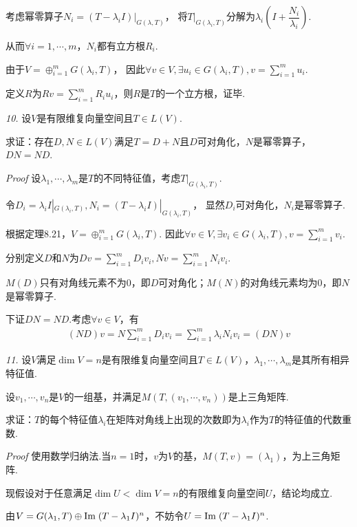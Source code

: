 考虑幂零算子\(N_i=(T-\lambda_i I)|_{G(\lambda,T)}\)，
将\(T|_{G(\lambda_i,T)}\)分解为\(\lambda_i(I+\dfrac{N_i}{\lambda_i})\).

从而\(\forall i=1,\cdots,m\)，\(N_i\)都有立方根\(R_i\).

由于\(V=\oplus_{i=1}^m G(\lambda_i,T)\)，
因此\(\forall v \in V,\exists u_i \in G(\lambda_i,T),v=\sum_{i=1}^m u_i\).

定义\(R\)为\(Rv=\sum_{i=1}^m R_iu_i\)，则\(R\)是\(T\)的一个立方根，证毕.

\newpage

\textit{10.}
设\(V\)是有限维复向量空间且\(T \in L(V)\).

求证：存在\(D,N \in L(V)\)满足\(T=D+N\)且\(D\)可对角化，\(N\)是幂零算子，\(DN=ND\).

\textit{Proof}
设\(\lambda_1,\cdots,\lambda_m\)是\(T\)的不同特征值，考虑\(T|_{G(\lambda_i,T)}\).

令\(D_i=\lambda_i I|_{G(\lambda_i,T)},N_i=(T-\lambda_i I)|_{G(\lambda_i,T)}\)，
显然\(D_i\)可对角化，\(N_i\)是幂零算子.

根据定理8.21，\(V=\oplus_{i=1}^m G(\lambda_i,T)\).
因此\(\forall v \in V,\exists v_i \in G(\lambda_i,T),v=\sum_{i=1}^m v_i\).

分别定义\(D\)和\(N\)为\(Dv=\sum_{i=1}^m D_iv_i,Nv=\sum_{i=1}^m N_iv_i\).

\(M(D)\)只有对角线元素不为\(0\)，即\(D\)可对角化；\(M(N)\)的对角线元素均为\(0\)，即\(N\)是幂零算子.

下证\(DN=ND\).考虑\(\forall v \in V\)，有
    \begin{align*}
        (ND)v=N\sum_{i=1}^m D_iv_i=\sum_{i=1}^m \lambda_iN_iv_i=(DN)v
    \end{align*}

\hspace*{\fill}

\textit{11.}
设\(V\)满足\(\dim V=n\)是有限维复向量空间且\(T \in L(V)\)，\(\lambda_1,\cdots,\lambda_m\)是其所有相异特征值.

设\(v_1,\cdots,v_n\)是\(V\)的一组基，并满足\(M(T,(v_1,\cdots,v_n))\)是上三角矩阵.

求证：\(T\)的每个特征值\(\lambda_i\)在矩阵对角线上出现的次数即为\(\lambda_i\)作为\(T\)的特征值的代数重数.

\textit{Proof}
使用数学归纳法.当\(n=1\)时，\(v\)为\(V\)的基，\(M(T,v)=(\lambda_1)\)，为上三角矩阵.

现假设对于任意满足\(\dim U<\dim V=n\)的有限维复向量空间\(U\)，结论均成立.

由\(V=G(\lambda_1,T) \oplus \mathrm{Im \;} (T-\lambda_1 I)^n\)，不妨令\(U=\mathrm{Im \;} (T-\lambda_1 I)^n\).


